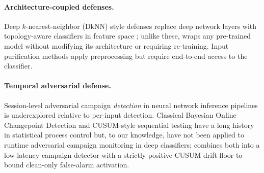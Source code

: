 \paragraph{Architecture-coupled defenses.}
Deep $k$-nearest-neighbor (DkNN) style defenses replace deep network
layers with topology-aware classifiers in feature space
\cite{papernot2018deep}; unlike these, \prism wraps any pre-trained
model without modifying its architecture or requiring re-training.
Input purification methods \cite{shi2021online,yoon2021adversarial}
apply preprocessing but require end-to-end access to the classifier.

\paragraph{Temporal adversarial defense.}
Session-level adversarial campaign \emph{detection} in neural network
inference pipelines is underexplored relative to per-input detection.
Classical Bayesian Online Changepoint Detection \cite{adams2007bayesian}
and CUSUM-style sequential testing have a long history in statistical
process control but, to our knowledge, have not been applied to runtime
adversarial campaign monitoring in deep classifiers; \sacd combines
both into a low-latency campaign detector with a strictly positive
CUSUM drift floor to bound clean-only false-alarm activation.
